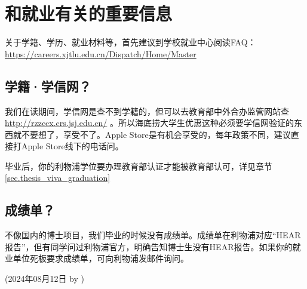 \section{和就业有关的重要信息}

关于学籍、学历、就业材料等，首先建议到学校就业中心阅读FAQ：\url{https://careers.xjtlu.edu.cn/Dispatch/Home/Master}

\subsection{学籍·学信网？}

我们在读期间，学信网是查不到学籍的，但可以去教育部中外合办监管网站查 \url{http://rzzccx.crs.jsj.edu.cn/} 。所以海底捞大学生优惠这种必须要学信网验证的东西就不要想了，享受不了。Apple Store是有机会享受的，每年政策不同，建议直接打Apple Store线下的电话问。

毕业后，你的利物浦学位要办理教育部认证才能被教育部认可，详见章节 \ref{sec.thesis_viva_graduation} 

\subsection{成绩单？}

不像国内的博士项目，我们毕业的时候没有成绩单。成绩单在利物浦对应“HEAR报告”，但有同学问过利物浦官方，明确告知博士生没有HEAR报告。如果你的就业单位死板要求成绩单，可向利物浦发邮件询问。

\begin{flushright}
    (2024年08月12日 by \Wu)
\end{flushright}







% 
